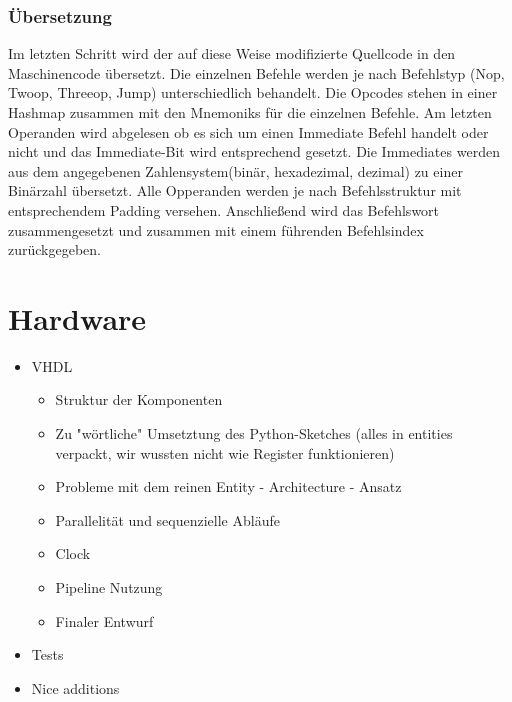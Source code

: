 \documentclass[paper=a4,fontsize=12pt]{scrreprt}
\begin{document}
\subsection{Übersetzung}
Im letzten Schritt wird der auf diese Weise modifizierte Quellcode in den Maschinencode übersetzt. Die einzelnen Befehle werden je nach Befehlstyp (Nop, Twoop, Threeop, Jump) unterschiedlich behandelt. Die Opcodes stehen in einer Hashmap zusammen mit den Mnemoniks für die einzelnen Befehle. Am letzten Operanden wird abgelesen ob es sich um einen Immediate Befehl handelt oder nicht und das Immediate-Bit wird entsprechend gesetzt. Die Immediates werden aus dem angegebenen Zahlensystem(binär, hexadezimal, dezimal) zu einer Binärzahl übersetzt. Alle Opperanden werden je nach Befehlsstruktur mit entsprechendem Padding versehen. Anschließend wird das Befehlswort zusammengesetzt und zusammen mit einem führenden Befehlsindex zurückgegeben.


\chapter{Hardware}

\begin{itemize}
    \item VHDL
    \begin{itemize}
        \item Struktur der Komponenten
        \item Zu "wörtliche" Umsetztung des Python-Sketches (alles in entities verpackt, wir wussten nicht wie Register funktionieren)
        \item Probleme mit dem reinen Entity - Architecture - Ansatz
        \item Parallelität und sequenzielle Abläufe 
        \item Clock
        \item Pipeline Nutzung
        \item Finaler Entwurf
    \end{itemize}
    \item Tests
    \item Nice additions
\end{itemize}
\end{document}
